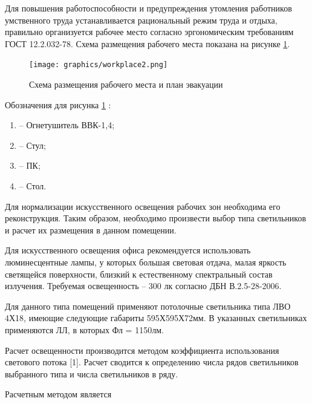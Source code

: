 Для повышения работоспособности и предупреждения утомления работников умственного труда  устанавливается
рациональный режим труда и отдыха, правильно организуется рабочее место согласно эргономическим  требованиям
ГОСТ 12.2.032-78. Схема размещения рабочего места показана на рисунке \ref{fig:workplace}.

\begin{figure}[!ht]
    \centering
    \texttt{[image: graphics/workplace2.png]}
    \caption{Схема размещения рабочего места и план эвакуации}
    \label{fig:workplace}
\end{figure}

Обозначения для рисунка \ref{fig:workplace} :

\begin{enumerate}
    \item -- Огнетушитель ВВК-1,4;
    \item -- Стул;
    \item -- ПК;
    \item -- Стол.
\end{enumerate}

Для нормализации искусственного освещения рабочих зон необходима его реконструкция. Таким образом,
необходимо произвести выбор типа светильников и расчет их размещения в данном помещении.

Для искусственного освещения офиса рекомендуется использовать люминесцентные лампы, у которых большая световая отдача,
малая яркость светящейся поверхности, близкий к естественному спектральный состав излучения. Требуемая освещенность --
300 лк согласно ДБН В.2.5-28-2006.

Для данного типа помещений применяют потолочные светильника типа ЛВО 4Х18, имеющие следующие габариты 595Х595Х72мм.
В указанных светильниках применяются ЛЛ, в которых Фл = 1150лм.

Расчет освещенности производится методом коэффициента использования светового потока [1].
Расчет сводится к определению числа рядов светильников выбранного типа и числа светильников в ряду.

Расчетным методом является


